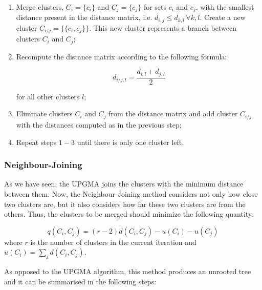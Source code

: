 \begin{enumerate}
    \item Merge clusters, $C_i = \{ c_i \}$ and $C_j = \{ c_j \}$ for sets $c_i$ and $c_j$, with the smallest distance present in the distance matrix, i.e. $d_{i,j}\leq d_{k,l}\, \forall k, l$. Create a new cluster $C_{i/j} = \{ \{ c_i, c_j \} \}$. This new cluster represents a branch between clusters $C_i$ and $C_j$;
    \item Recompute the distance matrix according to the following formula:
    
    $$d_{i/j, l} = \frac{d_{i, l} + d_{j, l}}{2}$$
    
    for all other clusters $l$;
    \item Eliminate clusters $C_i$ and $C_j$ from the distance matrix and add cluster $C_{i/j}$ with the distances computed as in the previous step;
    \item Repeat steps $1-3$ until there is only one cluster left.
\end{enumerate}


\subsubsection{Neighbour-Joining}

As we have seen, the UPGMA joins the clusters with the minimum distance between them. Now, the Neighbour-Joining method considers not only how close two clusters are, but it also considers how far these two clusters are from the others. Thus, the clusters to be merged should minimize the following quantity:

$$q(C_i,C_j) = (r-2) d(C_i, C_j) - u(C_i) - u(C_j)$$
where $r$ is the number of clusters in the current iteration and $u(C_i) = \sum_j d(C_i, C_j)$. 

As opposed to the UPGMA algorithm, this method produces an unrooted tree and it can be summarised in the following steps:

